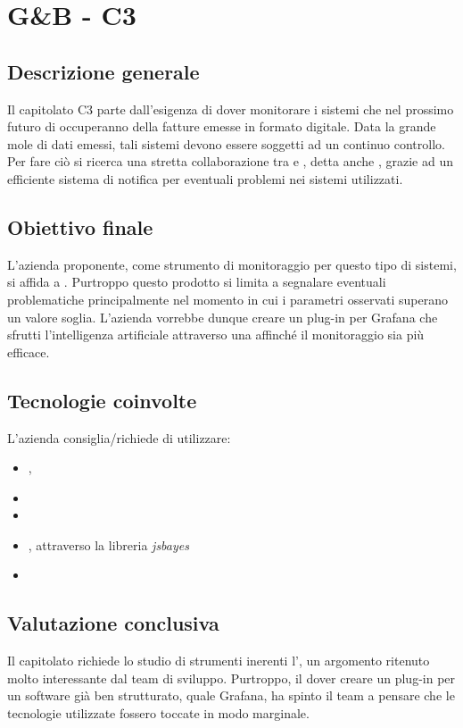 \section{G\&B - C3} \label{c3}
    \subsection{Descrizione generale}
    Il capitolato C3 parte dall'esigenza di dover monitorare i sistemi che nel prossimo futuro di occuperanno della fatture emesse in formato digitale.
    Data la grande mole di dati emessi, tali sistemi devono essere soggetti ad un continuo controllo. Per fare ciò si ricerca una stretta collaborazione
    tra  e , detta anche , grazie ad un efficiente sistema di notifica per eventuali problemi nei sistemi utilizzati.

    \subsection{Obiettivo finale}
    L'azienda proponente, come strumento di monitoraggio per questo tipo di sistemi, si affida a . Purtroppo questo prodotto si limita a
    segnalare eventuali problematiche principalmente nel momento in cui i parametri osservati superano un valore soglia. L'azienda vorrebbe dunque creare un plug-in
    per Grafana che sfrutti l'intelligenza artificiale attraverso una  affinché il monitoraggio sia più efficace.

    \subsection{Tecnologie coinvolte}
    L'azienda consiglia/richiede di utilizzare:
    \begin{itemize}
    	\item {}, 
    	\item {}
    	\item {}
    	\item {}, attraverso la libreria \textit{jsbayes}
    	\item {}
    \end{itemize}

    \subsection{Valutazione conclusiva}
    Il capitolato richiede lo studio di strumenti inerenti l', un argomento ritenuto molto interessante dal team di sviluppo.
    Purtroppo, il dover creare un plug-in per un software già ben strutturato, quale Grafana, ha spinto il team a pensare che le tecnologie utilizzate fossero
    toccate in modo marginale.

